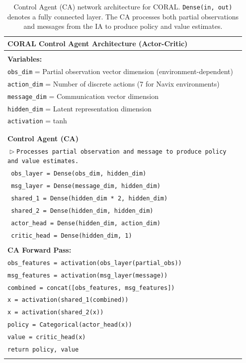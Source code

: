 \documentclass[letterpaper]{article} %
\begin{document}
\begin{appendix}
\begin{table}[!htbp]
\centering
\caption{Control Agent (CA) network architecture for CORAL. \texttt{Dense(in, out)} denotes a fully connected layer. The CA processes both partial observations and messages from the IA to produce policy and value estimates.}
\label{tab:coral_ca_architecture}
\begin{tabular}{@{}p{0.95\linewidth}@{}}
\toprule[\heavyrulewidth]
\textbf{CORAL Control Agent Architecture (Actor-Critic)} \\
\midrule
\\
\textbf{Variables:} \\
\texttt{obs\_dim} = Partial observation vector dimension (environment-dependent) \\
\texttt{action\_dim} = Number of discrete actions (7 for Navix environments) \\
\texttt{message\_dim} = Communication vector dimension \\
\texttt{hidden\_dim} = Latent representation dimension \\
\texttt{activation} = tanh \\
\\ \hline \\
\textbf{Control Agent (CA)} \\
\texttt{$\vartriangleright$\hspace{0.5em}Processes partial observation and message to produce policy and value estimates.} \\
\texttt{  obs\_layer = Dense(obs\_dim, hidden\_dim)} \\
\texttt{  msg\_layer = Dense(message\_dim, hidden\_dim)} \\
\texttt{  shared\_1 = Dense(hidden\_dim * 2, hidden\_dim)} \\
\texttt{  shared\_2 = Dense(hidden\_dim, hidden\_dim)} \\
\texttt{  actor\_head = Dense(hidden\_dim, action\_dim)} \\
\texttt{  critic\_head = Dense(hidden\_dim, 1)} \\
\\
\textbf{CA Forward Pass:} \\
\texttt{obs\_features = activation(obs\_layer(partial\_obs))} \\
\texttt{msg\_features = activation(msg\_layer(message))} \\
\texttt{combined = concat([obs\_features, msg\_features])} \\
\texttt{x = activation(shared\_1(combined))} \\
\texttt{x = activation(shared\_2(x))} \\
\texttt{policy = Categorical(actor\_head(x))} \\
\texttt{value = critic\_head(x)} \\
\texttt{return policy, value} \\
\\
\bottomrule[\heavyrulewidth]
\end{tabular}
\end{table}




\end{appendix}
\end{document}
